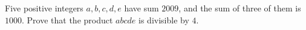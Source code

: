 Five positive integers $a,b,c,d,e$ have sum $2009$, and the sum of three of them is $1000$. Prove that the product $abcde$ is divisible by $4$.
